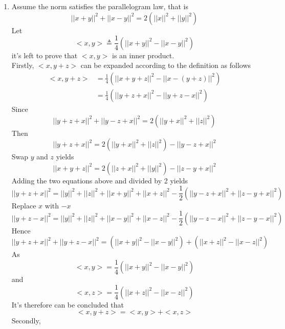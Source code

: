 \documentclass[paper=a4, fontsize=11pt]{scrartcl} %
\numberwithin{equation}{section} %
\numberwithin{figure}{section} %
\numberwithin{table}{section} %
\begin{document}
\begin{enumerate}
		\item 
			Assume the norm satisfies the parallelogram law, that is
			\begin{equation}
				||x+y||^2 + ||x-y||^2 = 2(||x||^2 + ||y||^2)
			\end{equation}
			Let
			\begin{equation}
				<x, y> \triangleq \frac{1}{4}(||x+y||^2 - ||x-y||^2)
			\end{equation}
			it's left to prove that $<x, y>$ is an inner product.\\
			Firstly, $<x, y+z>$ can be expanded according to the definition as follows
			\begin{equation}
				\begin{aligned}
					<x, y+z> & = \frac{1}{4}(||x+y+z||^2 - ||x-(y+z)||^2)\\
					         & = \frac{1}{4}(||y+z+x||^2 - ||y+z-x||^2)
				\end{aligned}
			\end{equation}
			Since
			\begin{equation}
				||y+z+x||^2 + ||y-z+x||^2 = 2(||y+x||^2 + ||z||^2)
			\end{equation}
			Then
			\begin{equation}
				||y+z+x||^2 = 2(||y+x||^2 + ||z||^2) - ||y-z+x||^2
			\end{equation}
			Swap $y$ and $z$ yields
			\begin{equation}
				||x+y+z||^2 = 2(||z+x||^2 + ||y||^2) - ||z-y+x||^2
			\end{equation}
			Adding the two equations above and divided by 2 yields
			\begin{equation}
				||y+z+x||^2 = ||y||^2 + ||z||^2 + ||x+y||^2 + ||x+z||^2 -\frac{1}{2}(||y-z+x||^2 + ||z-y+x||^2)
			\end{equation}
			Replace $x$ with $-x$
			\begin{equation}
				||y+z-x||^2 = ||y||^2 + ||z||^2 + ||x-y||^2 + ||x-z||^2 -\frac{1}{2}(||y-z-x||^2 + ||z-y-x||^2)
			\end{equation}
			Hence
			\begin{equation}
				||y+z+x||^2 + ||y+z-x||^2 = (||x+y||^2 - ||x-y||^2) + (||x+z||^2 - ||x-z||^2)
			\end{equation}
			As
			\begin{equation}
				<x, y> = \frac{1}{4} (||x+y||^2 - ||x-y||^2)
			\end{equation}
			and
			\begin{equation}
				<x, z> = \frac{1}{4} (||x+z||^2 - ||x-z||^2)
			\end{equation}
			It's therefore can be concluded that
			\begin{equation}
				<x, y+z> = <x, y> + <x, z>
			\end{equation}
			Secondly, 
		
	\end{enumerate}
\end{document}
